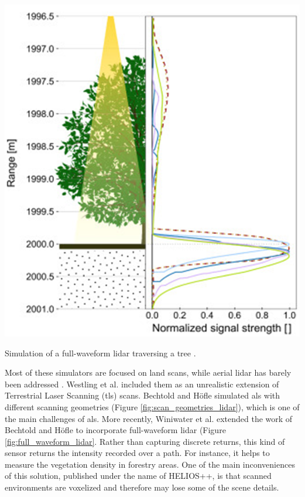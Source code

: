 \begin{marginfigure}[.0cm]
	\includegraphics{figs/context/waveform_lidar.png}
	\caption{Simulation of a full-waveform \acrshort{lidar} traversing a tree \cite{winiwarter_virtual_2022}.}
	\label{fig:full_waveform_lidar}
\end{marginfigure}
Most of these simulators are focused on land scans, while aerial \acrshort{lidar} has barely been addressed \cite{winiwarter_virtual_2022}. Westling et al. \cite{westling_simtreels_2020} included them as an unrealistic extension of Terrestrial Laser Scanning (\acrshort{tls}) scans. Bechtold and Höfle \cite{bechtold_helios_2016} simulated \acrshort{als} with different scanning geometries (Figure \ref{fig:scan_geometries_lidar}), which is one of the main challenges of \acrshort{als}. More recently, Winiwater et al. \cite{winiwarter_virtual_2022} extended the work of Bechtold and Höfle to incorporate full-waveform \acrshort{lidar} (Figure \ref{fig:full_waveform_lidar}. Rather than capturing discrete returns, this kind of sensor returns the intensity recorded over a path. For instance, it helps to measure the vegetation density in forestry areas. One of the main inconveniences of this solution, published under the name of HELIOS++, is that scanned environments are voxelized and therefore may lose some of the scene details. 

